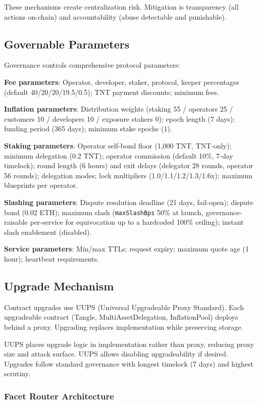 \documentclass[11pt,a4paper]{article}
\begin{document}
These mechanisms create centralization risk. Mitigation is transparency (all actions on-chain) and accountability (abuse detectable and punishable).

\subsection{Governable Parameters}

Governance controls comprehensive protocol parameters:

\textbf{Fee parameters}: Operator, developer, staker, protocol, keeper percentages (default 40/20/20/19.5/0.5); TNT payment discounts; minimum fees.

\textbf{Inflation parameters}: Distribution weights (staking 55 / operators 25 / customers 10 / developers 10 / exposure stakers 0); epoch length (7 days); funding period (365 days); minimum stake epochs (1).

\textbf{Staking parameters}: Operator self-bond floor (1{,}000 TNT, TNT-only); minimum delegation (0.2 TNT); operator commission (default 10\%, 7-day timelock); round length (6 hours) and exit delays (delegator 28 rounds, operator 56 rounds); delegation modes; lock multipliers (1.0/1.1/1.2/1.3/1.6x); maximum blueprints per operator.

\textbf{Slashing parameters}: Dispute resolution deadline (21 days, fail-open); dispute bond (0.02 ETH); maximum slash (\texttt{maxSlashBps} 50\% at launch, governance-raisable per-service for equivocation up to a hardcoded 100\% ceiling); instant slash enablement (disabled).

\textbf{Service parameters}: Min/max TTLs; request expiry; maximum quote age (1 hour); heartbeat requirements.

\subsection{Upgrade Mechanism}

Contract upgrades use UUPS (Universal Upgradeable Proxy Standard). Each upgradeable contract (Tangle, MultiAssetDelegation, InflationPool) deploys behind a proxy. Upgrading replaces implementation while preserving storage.

UUPS places upgrade logic in implementation rather than proxy, reducing proxy size and attack surface. UUPS allows disabling upgradeability if desired. Upgrades follow standard governance with longest timelock (7 days) and highest scrutiny.

\subsubsection{Facet Router Architecture}
\end{document}
